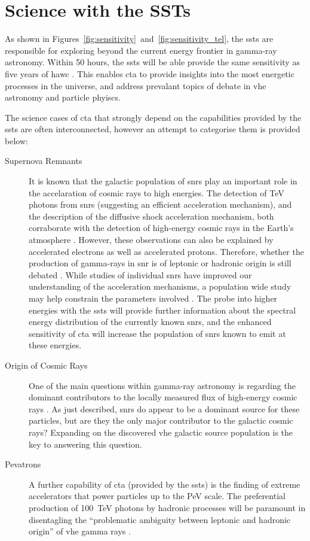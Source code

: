 \section{Science with the SSTs}

As shown in Figures~\ref{fig:sensitivity}~and~\ref{fig:sensitivity_tel}, the \glspl{sst} are responsible for exploring beyond the current energy frontier in gamma-ray astronomy. Within 50 hours, the \glspl{sst} will be able provide the same sensitivity as five years of \gls{hawc}  \cite{Consortium2018}. This enables \gls{cta} to provide insights into the most energetic processes in the universe, and address prevalant topics of debate in \gls{vhe} astronomy and particle phyiscs.

The science cases of \gls{cta} that strongly depend on the capabilities provided by the \glspl{sst} are often interconnected, however an attempt to categorise them is provided below:
\begin{description}
\item [Supernova Remnants] It is known that the galactic population of \glspl{snr} play an important role in the accelaration of cosmic rays to high energies. The detection of \si{TeV} photons from \glspl{snr} (suggesting an efficient acceleration mechanism), and the description of the diffusive shock acceleration mechanism, both corraborate with the detection of high-energy cosmic rays in the Earth's atmosphere \cite{Cristofari2017}. However, these observations can also be explained by accelerated electrons as well as accelerated protons. Therefore, whether the production of gamma-rays in \gls{snr} is of leptonic or hadronic origin is still debated \cite{Acharya2013}. While studies of individual \glspl{snr} have improved our understanding of the acceleration mechanisms, a population wide study may help constrain the parameters involved \cite{Cristofari2017}. The probe into higher energies with the \glspl{sst} will provide further information about the spectral energy distribution of the currently known \glspl{snr}, and the enhanced sensitivity of \gls{cta} will increase the population of \glspl{snr} known to emit at these energies.
\item [Origin of Cosmic Rays] One of the main questions within gamma-ray astronomy is regarding the dominant contributors to the locally measured flux of high-energy cosmic rays \cite{Bigongiari2016}. As just described, \glspl{snr} do appear to be a dominant source for these particles, but are they the only major contributor to the galactic cosmic rays? Expanding on the discovered \gls{vhe} galactic source population is the key to answering this question.
\item [Pevatrons] A further capability of \gls{cta} (provided by the \glspl{sst}) is the finding of extreme accelerators that power particles up to the \si{PeV} scale. The preferential production of \SI{100}{TeV} photons by hadronic processes will be paramount in disentagling the ``problematic ambiguity between leptonic and hadronic origin'' of \gls{vhe} gamma rays \cite[][p. 132]{Consortium2018}.
\end{description}